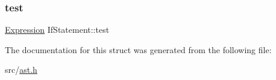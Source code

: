 \mbox{\label{struct_if_statement_aaabaa9e831e2bb8e0efac3b72e46ffc9}} 
\subsubsection{\texorpdfstring{test}{test}}
{\footnotesize\ttfamily \hyperlink{ast_8h_a4cb273a4d960cd13ea17d08f254493e8}{Expression} If\+Statement\+::test}



The documentation for this struct was generated from the following file\+:\begin{DoxyCompactItemize}
\item 
src/\hyperlink{ast_8h}{ast.\+h}\end{DoxyCompactItemize}
